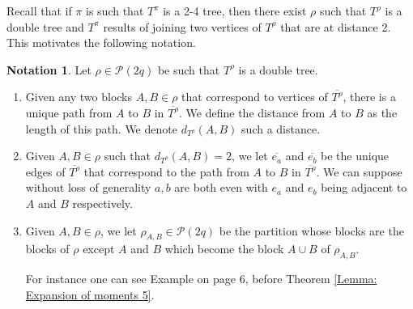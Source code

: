 \documentclass{article}
\theoremstyle{definition}
\newtheorem{notation}   [theorem]{Notation}
\newcommand{\cP}{\mathcal{P}}
\begin{document}
{Recall that if $\pi$ is such that $T^\pi$ is a 2-4 tree, then there exist $\rho$ such that $T^\rho$ is a double tree and $T^\pi$ results of joining two vertices of $T^\rho$ that are at distance 2. This motivates the following notation.

\begin{notation}\label{Notation: Distance in double tree}
Let $\rho\in \cP(2q)$ be such that $T^\rho$ is a double tree. 
\begin{enumerate}
    \item Given any two blocks $A,B\in \rho$ that correspond to vertices of $\overline{T^\rho}$, there is a unique path from $A$ to $B$ in $\overline{T^\rho}$. We define the distance from $A$ to $B$ as the length of this path. We denote $d_{T^\rho}(A,B)$ such a distance.
    \item Given $A,B\in \rho$ such that $d_{T^\rho}(A,B)=2$, we let $\overline{e_a}$ and $\overline{e_b}$ be the unique edges of $\overline{T^\rho}$ that correspond to the path from $A$ to $B$ in $\overline{T^\rho}$. We can suppose without loss of generality $a,b$ are both even with $e_a$ and $e_b$ being adjacent to $A$ and $B$ respectively.
    \item Given $A,B\in \rho$, we let $\rho_{A,B}\in \cP(2q)$ be the partition whose blocks are the blocks of $\rho$ except $A$ and $B$ which become the block $A\cup B$ of $\rho_{A,B}$. 

For instance one can see Example on page 6, before Theorem \ref{Lemma: Expansion of moments 5}. 
\end{enumerate}
\end{notation}

}
\end{document}
